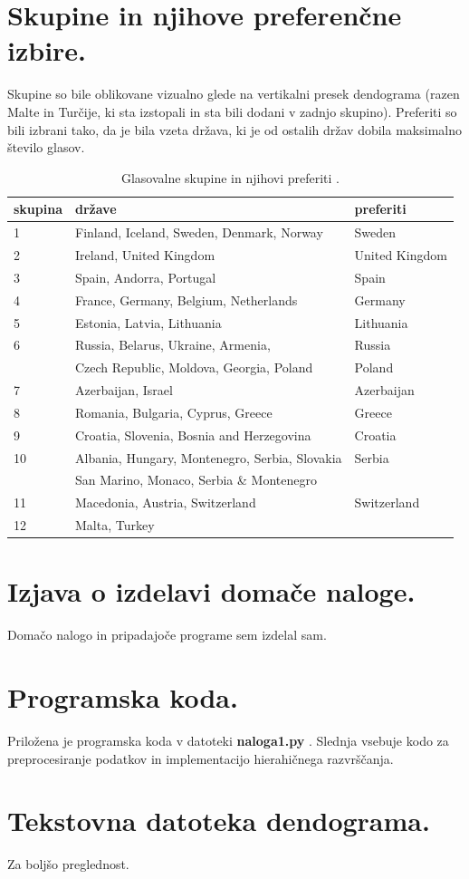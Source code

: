 \documentclass[a4paper,11pt]{article}
\begin{document}
\pagebreak
\section{Skupine in njihove preferenčne izbire.}
Skupine so bile oblikovane vizualno glede na vertikalni presek dendograma (razen Malte in Turčije, ki sta izstopali in sta bili dodani v zadnjo skupino). Preferiti so bili izbrani tako, da je bila vzeta država, ki je od ostalih držav dobila maksimalno število glasov.

\begin{table}[htbp]
\caption{Glasovalne skupine in njihovi preferiti .}
\label{tab1}
\begin{center}
\begin{tabular}{llp{3cm}}
\hline
skupina & države & preferiti \\
\hline
1 & Finland, Iceland, Sweden, Denmark, Norway & Sweden \\
2 & Ireland, United Kingdom & United Kingdom \\
3 & Spain, Andorra, Portugal & Spain\\
4 & France, Germany, Belgium, Netherlands & Germany\\
5 & Estonia, Latvia, Lithuania & Lithuania\\
6 & Russia, Belarus, Ukraine, Armenia,  & Russia\\
  & Czech Republic, Moldova, Georgia, Poland &  Poland\\
7 & Azerbaijan, Israel & Azerbaijan\\
8 & Romania, Bulgaria, Cyprus, Greece & Greece\\
9 & Croatia, Slovenia, Bosnia and Herzegovina & Croatia\\
10 & Albania, Hungary, Montenegro, Serbia, Slovakia & Serbia\\
  & San Marino, Monaco, Serbia \& Montenegro & \\
11 & Macedonia, Austria, Switzerland & Switzerland\\
12 & Malta, Turkey & \\
\hline
\end{tabular}
\end{center}
\end{table}


\section{Izjava o izdelavi domače naloge.}
Domačo nalogo in pripadajoče programe sem izdelal sam.

\appendix
\appendixpage
\section{\label{app-code}Programska koda.}

Priložena je programska koda v datoteki \textbf{naloga1.py} . Slednja vsebuje kodo za preprocesiranje podatkov in implementacijo hierahičnega razvrščanja.

\section{\label{app-dendo}Tekstovna datoteka dendograma.}
Za boljšo preglednost.
\end{document}
